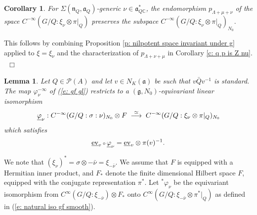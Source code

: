 \documentclass[12pt,a4paper]{article}
\newtheorem{Cor}[Thm]{Corollary}
\newtheorem{Lemma}[Thm]{Lemma}
\newenvironment{cor}[0]{\begin{Cor}\noindent}%
{\end{Cor}}
\newenvironment{lemma}[0]{\begin{Lemma}\noindent}%
{\end{Lemma}}
\def\proof{\par\noindent{\it Proof.}{\ }{\ }}
\def\qed{~\hfill\hbox{$\Box$}\medbreak}
\def\msy#1{{\mathbb #1}}
\def\C{{\msy C}}
\def\gf{\varphi}
\def\gs{\sigma}
\def\gS{\Sigma}
\def\got#1{\mathfrak #1}
\def\fa{{\got a}}
\def\fg{{\got g}}
\def\fn{{\got n}}
\def\after{\,{\scriptstyle\circ}\,}
\def\iC{{\scriptscriptstyle \C}}
\def\cP{{\mathcal P}}
\numberwithin{Thm}{section}
\numberwithin{equation}{section}
\def\ev{{\rm ev}}
\def\gL{\Lambda}
\numberwithin{equation}{section}
\def\gL{\Lambda}
\def\faQdc{\fa_{Q\iC}^*}
\begin{document}
\begin{cor}
\label{c: proj preserves Nzero space}
For $\gS(\fn_Q,\fa_Q)$-generic $\nu \in \faQdc$, the endomorphism $p_{\gL + \mu + \nu}$ of 
the space 
 $C^{-\infty}(G/Q: \xi_\nu \otimes \pi|_Q)$ preserves the subspace 
 $C^{-\infty}(G/Q:  \xi_\nu \otimes \pi|_Q)_{N_0}.$ 
\end{cor}

\proof
This follows by combining Proposition \ref{p: nilpotent space invariant under g} applied
to $\xi = \xi_\nu$ and the characterization of $p_{\gL +\nu +\mu}$ in Corollary \ref{c: q p is Z nu}.
\qed

\begin{lemma}
\label{l: gf nu and ev v}
Let $Q \in \cP(A)$ and let $v \in N_K(\fa)$ be such that $v \bar Q v^{-1}$ is standard.
The map $\gf_\nu^{-\infty}$ of (\ref{e: gf gl}) restricts to a $(\fg, N_0)$-equivariant linear isomorphism 
\begin{equation}
\label{e: underline gf nu}
 \underline\gf_\nu:  C^{-\infty}(G/Q:\gs: \nu)_{N_0} \otimes F\;\;{ \buildrel \simeq \over \longrightarrow}\;\; C^{-\infty}(G/Q: \xi_\nu \otimes \pi|_Q)_{N_0}
 \end{equation}
 which satisfies
\begin{equation}
\label{e: underline gf eval}
\underline{\ev}_v \after \underline \gf_\nu = \underline \ev_v \otimes \pi(v)^{-1}.
\end{equation}
 \end{lemma}
\medbreak
\proof
We note that $(\xi_\nu)^* = \gs \otimes -\bar \nu =\xi_{-\bar \nu}.$ We assume that
$F$ is equipped with a Hermitian inner product, and $F_*$ denote
the finite dimensional Hilbert space $F$, equipped with the conjugate representation $\pi^*.$ 
Let ${}^*\gf_{\nu}$ be the equivariant isomorphism from $C^\infty(G/Q: \xi_{-\bar \nu}) \otimes F_*$ onto 
$C^\infty(G/Q: \xi_{-\bar \nu} \otimes \pi^*|_Q)$ 
as defined in (\ref{e: natural iso gf smooth}).
\end{document}
